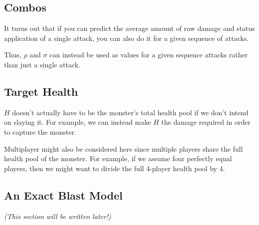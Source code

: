 \documentclass{article}
\begin{document}
\subsection{Combos}%
\label{sub:combos}

It turns out that if you can predict the average amount of raw damage and status application of a single attack, you can also do it for a given sequence of attacks.

Thus, $\rho$ and $\sigma$ can instead be used as values for a given sequence attacks rather than just a single attack.


\subsection{Target Health}%
\label{sub:target_health}

$H$ doesn't actually have to be the monster's total health pool if we don't intend on slaying it. For example, we can instead make $H$ the damage required in order to capture the monster.

Multiplayer might also be considered here since multiple players share the full health pool of the monster. For example, if we assume four perfectly equal players, then we might want to divide the full 4-player health pool by 4.


\subsection{An Exact Blast Model}%
\label{sub:exact_blast_model}

\textit{(This section will be written later!)}
\end{document}
